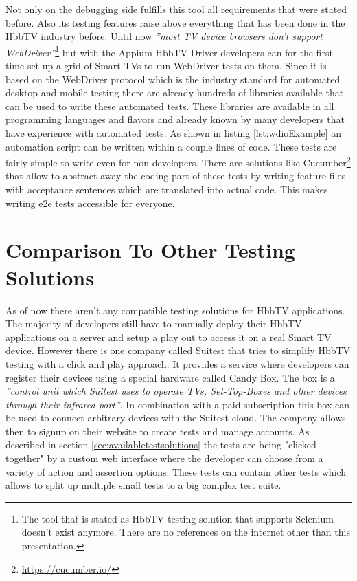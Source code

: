 Not only on the debugging side fulfills this tool all requirements that were stated before. Also its testing
features raise above everything that has been done in the HbbTV industry before. Until now \textit{''most TV
device browsers don’t support WebDriver''}\cite{sengo}\footnote{The tool that is stated as HbbTV testing solution
that supports Selenium doesn't exist anymore. There are no references on the internet other than this presentation.}
but with the Appium HbbTV Driver developers can for the first time set up a grid of Smart TVs to run WebDriver
tests on them. Since it is based on the WebDriver protocol which is the industry standard for automated desktop
and mobile testing there are already hundreds of libraries available that can be used to write these automated tests.
These libraries are available in all programming languages and flavors and already known by many developers that
have experience with automated tests. As shown in listing \ref{lst:wdioExample} an automation script can be written
within a couple lines of code. These tests are fairly simple to write even for non developers. There are solutions like
Cucumber\footnote{\url{https://cucumber.io/}} that allow to abstract away the coding part of these tests by writing
feature files with acceptance sentences which are translated into actual code. This makes writing e2e tests accessible
for everyone.

\section{Comparison To Other Testing Solutions\label{sec:businessmodel}}

As of now there aren't any compatible testing solutions for HbbTV applications. The majority of developers still have
to manually deploy their HbbTV applications on a server and setup a play out to access it on a real Smart TV device.
However there is one company called Suitest that tries to simplify HbbTV testing with a click and play approach.
It provides a service where developers can register their devices using a special hardware called Candy Box. The box
is a \textit{''control unit which Suitest uses to operate TVs, Set-Top-Boxes and other devices through their infrared
port''}\cite{candybox}. In combination with a paid subscription this box can be used to connect arbitrary devices
with the Suitest cloud. The company allows then to signup on their website to create tests and manage accounts.
As described in section \ref{sec:availabletestsolutions} the tests are being "clicked together" by a custom web interface
where the developer can choose from a variety of action and assertion options. These tests can contain other tests
which allows to split up multiple small tests to a big complex test suite.

